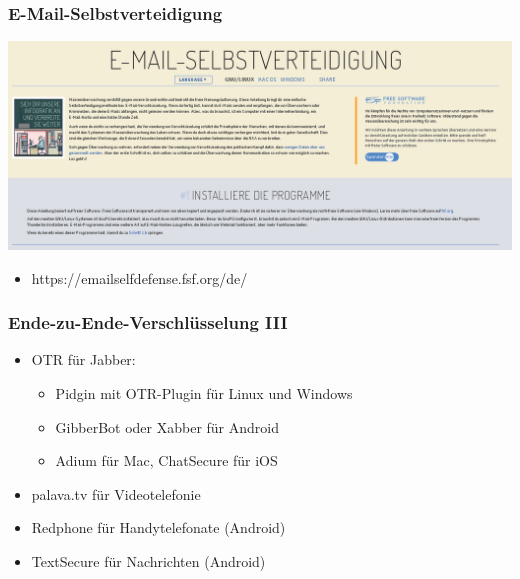 \documentclass[12pt]{beamer}
\begin{document}
\begin{frame}
  \frametitle{E-Mail-Selbstverteidigung}
  \begin{center}
    \includegraphics[height=0.5\textheight]{img/emailselfdefense.png}
    \begin{itemize}
      \item https://emailselfdefense.fsf.org/de/
    \end{itemize}	
  \end{center}	
\end{frame}

\begin{frame}
  \frametitle{Ende-zu-Ende-Verschlüsselung III}
  \begin{itemize}
    \item<2-> OTR für Jabber:
      \begin{itemize}
        \item Pidgin mit OTR-Plugin für Linux und Windows
        \item GibberBot oder Xabber für Android
        \item Adium für Mac, ChatSecure für iOS
      \end{itemize}
    \item<3-> palava.tv für Videotelefonie
    \item<4-> Redphone für Handytelefonate (Android)
    \item<5-> TextSecure für Nachrichten (Android)
  \end{itemize}
\end{frame}
\end{document}
